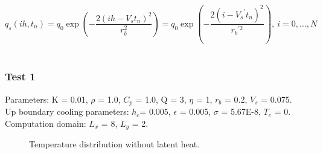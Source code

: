 \documentclass[a4paper,12pt]{article}
\begin{document}
\begin{equation}
q_s (ih, t_n) =q_0\exp \left( -\frac{ 2(ih-V_s t_n)^2}{ r_b^2} \right)= q_0\exp \left( -\frac{ 2(i-{V_s}^{'} t_n)^2}{{ r_b}^{'2}} \right) , \ i = 0 , \dots , N
\end{equation}
\\
\subsubsection{Test 1}
Parameters: K = 0.01, $\rho$ = 1.0, $C_p$ = 1.0, Q = 3, $\eta$ = 1, $r_b$ = 0.2, $V_s$ = 0.075. \\
Up boundary cooling parameters: $h_c$= 0.005, $\epsilon$ = 0.005, $\sigma$ = 5.67E-8, $T_e$ = 0.\\
Computation domain: $L_x$ = 8, $L_y$ = 2.



\begin{figure}[!ht]
     \hfill
     \caption{Temperature distribution without latent heat.}
     \label{fig:nolatent}
   \end{figure}
\end{document}
